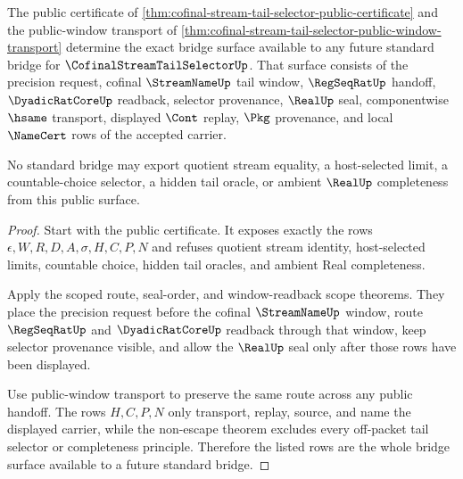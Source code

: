 \begin{theorem}
\label{thm:cofinal-stream-tail-selector-bridge-surface}
The public certificate of \autoref{thm:cofinal-stream-tail-selector-public-certificate} and the public-window transport of \autoref{thm:cofinal-stream-tail-selector-public-window-transport} determine the exact bridge surface available to any future standard bridge for $\CofinalStreamTailSelectorUp$. That surface consists of the precision request, cofinal $\StreamNameUp$ tail window, $\RegSeqRatUp$ handoff, $\DyadicRatCoreUp$ readback, selector provenance, $\RealUp$ seal, componentwise $\hsame$ transport, displayed $\Cont$ replay, $\Pkg$ provenance, and local $\NameCert$ rows of the accepted carrier.

No standard bridge may export quotient stream equality, a host-selected limit, a countable-choice selector, a hidden tail oracle, or ambient $\RealUp$ completeness from this public surface.
\end{theorem}
\begin{proof}
Start with the public certificate. It exposes exactly the rows $\epsilon,W,R,D,A,\sigma,H,C,P,N$ and refuses quotient stream identity, host-selected limits, countable choice, hidden tail oracles, and ambient Real completeness.

Apply the scoped route, seal-order, and window-readback scope theorems. They place the precision request before the cofinal $\StreamNameUp$ window, route $\RegSeqRatUp$ and $\DyadicRatCoreUp$ readback through that window, keep selector provenance visible, and allow the $\RealUp$ seal only after those rows have been displayed.

Use public-window transport to preserve the same route across any public handoff. The rows $H,C,P,N$ only transport, replay, source, and name the displayed carrier, while the non-escape theorem excludes every off-packet tail selector or completeness principle. Therefore the listed rows are the whole bridge surface available to a future standard bridge.
\end{proof}

